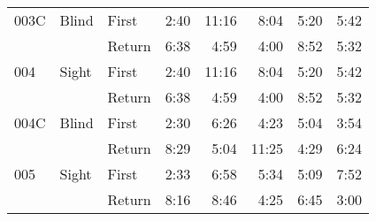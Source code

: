 \begin{table}[!htb]
\begin{tabular}{lllrrrrr}
003C & Blind & First &   2:40 &  11:16 &                                               8:04 &                                               5:20 &    5:42 \\
    &       & Return &   6:38 &   4:59 &                                               4:00 &                                               8:52 &    5:32 \\
004 & Sight & First &   2:40 &  11:16 &                                               8:04 &                                               5:20 &    5:42 \\
    &       & Return &   6:38 &   4:59 &                                               4:00 &                                               8:52 &    5:32 \\
004C & Blind & First &   2:30 &   6:26 &                                               4:23 &                                               5:04 &    3:54 \\
    &       & Return &   8:29 &   5:04 &                                              11:25 &                                               4:29 &    6:24 \\
005 & Sight & First &   2:33 &   6:58 &                                               5:34 &                                               5:09 &    7:52 \\
    &       & Return &   8:16 &   8:46 &                                               4:25 &                                               6:45 &    3:00 \\
\bottomrule
\end{tabular}
\end{table}

